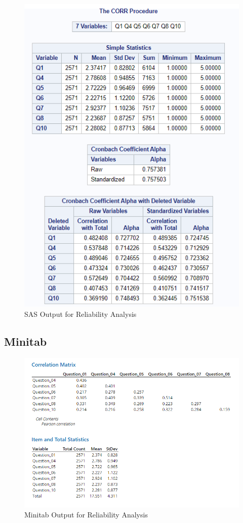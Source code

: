 \documentclass[
]{book}
\begin{document}
\begin{figure}[!h]
\includegraphics{Screenshots/Reliability/ReliabilitySAS} \caption{\label{fig:reliSAS}SAS Output for Reliability Analysis}\label{fig:reliSAS}
\end{figure}

\hypertarget{minitab}{%
\subsection{Minitab}\label{minitab}}

\begin{figure}[!h]
\includegraphics{Screenshots/Reliability/ReliabilityMinitab1} \caption{\label{fig:reliMinitab}Minitab Output for Reliability Analysis}\label{fig:reliMinitab}
\end{figure}
\end{document}
